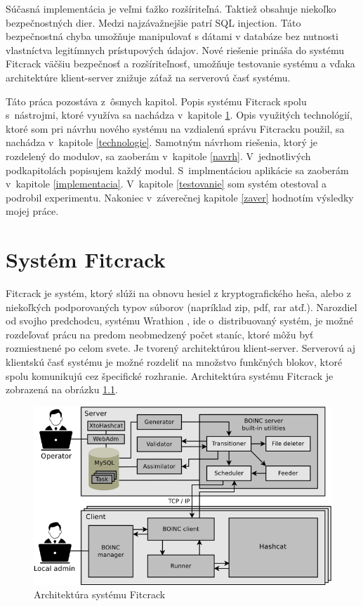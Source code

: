 \documentclass[zadani,slovak]{fitthesis}
\begin{document}
Súčasná implementácia je veľmi ťažko rozšíriteľná. Taktiež obsahuje niekoľko bezpečnostných dier. Medzi najzávažnejšie patrí SQL injection. Táto bezpečnostná chyba umožňuje manipulovať s dátami v databáze bez nutnosti vlastníctva legitímnych prístupových údajov. Nové riešenie prináša do systému Fitcrack väčšiu bezpečnosť a rozšíriteľnosť, umožňuje testovanie systému a vďaka architektúre klient-server znižuje záťaž na serverovú časť systému.

Táto práca pozostáva z~ôsmych kapitol. Popis systému Fitcrack spolu s~nástrojmi, ktoré využíva sa nachádza v~kapitole \ref{Fitcrack}. Opis využitých technológií, ktoré som pri návrhu nového systému na vzdialenú správu Fitcracku použil, sa nachádza v~kapitole \ref{technologie}. Samotným návrhom riešenia, ktorý je rozdelený do modulov, sa zaoberám v~kapitole \ref{navrh}. V~jednotlivých podkapitolách popisujem každý modul. S~implmentáciou aplikácie sa zaoberám v~kapitole \ref{implementacia}. V~kapitole \ref{testovanie} som systém otestoval a podrobil experimentu. Nakoniec v~záverečnej kapitole \ref{zaver} hodnotím výsledky mojej práce. 



\chapter{Systém Fitcrack}\label{Fitcrack}
Fitcrack je systém, ktorý slúži na obnovu hesiel z kryptografického heša, alebo z niekoľkých podporovaných typov súborov (napríklad zip, pdf, rar atď.). Narozdiel od svojho predchodcu, systému Wrathion \cite{wrathion}, ide o~distribuovaný systém, je možné rozdeľovať prácu na predom neobmedzený počet staníc, ktoré môžu byť rozmiestnené po celom svete. Je tvorený architektúrou klient-server. Serverovú aj klientskú časť systému je možné rozdeliť na množstvo funkčných blokov, ktoré spolu komunikujú cez špecifické rozhranie. Architektúra systému Fitcrack je zobrazená na obrázku \ref{fig:archFitcrackTrac}. 
\begin{figure}[H]
    \centering
    \includegraphics[scale=0.5]{obrazky/fitcrack_arch_web.png}
    \caption{Architektúra systému Fitcrack \cite{fitcrackSprava}}
    \label{fig:archFitcrackTrac}
\end{figure}
\end{document}
